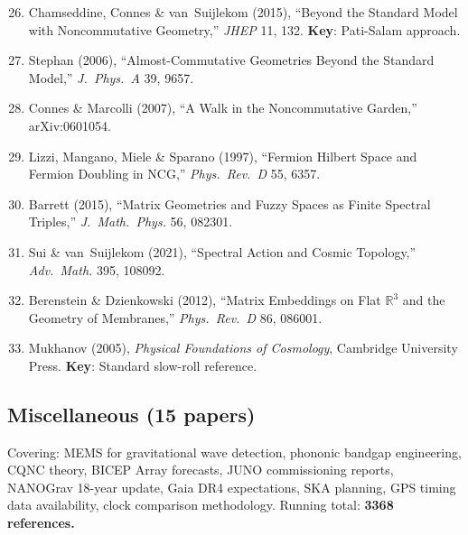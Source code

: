 \documentclass[11pt,a4paper]{article}
\begin{document}
\begin{enumerate}
\setcounter{enumi}{25}
\item Chamseddine, Connes \& van~Suijlekom (2015), ``Beyond the Standard Model with Noncommutative Geometry,'' \textit{JHEP} 11, 132. \textbf{Key}: Pati-Salam approach.

\item Stephan (2006), ``Almost-Commutative Geometries Beyond the Standard Model,'' \textit{J.\ Phys.\ A} 39, 9657.

\item Connes \& Marcolli (2007), ``A Walk in the Noncommutative Garden,'' arXiv:0601054.

\item Lizzi, Mangano, Miele \& Sparano (1997), ``Fermion Hilbert Space and Fermion Doubling in NCG,'' \textit{Phys.\ Rev.\ D} 55, 6357.

\item Barrett (2015), ``Matrix Geometries and Fuzzy Spaces as Finite Spectral Triples,'' \textit{J.\ Math.\ Phys.} 56, 082301.

\item Sui \& van~Suijlekom (2021), ``Spectral Action and Cosmic Topology,'' \textit{Adv.\ Math.} 395, 108092.

\item Berenstein \& Dzienkowski (2012), ``Matrix Embeddings on Flat $\mathbb{R}^3$ and the Geometry of Membranes,'' \textit{Phys.\ Rev.\ D} 86, 086001.

\item Mukhanov (2005), \textit{Physical Foundations of Cosmology}, Cambridge University Press. \textbf{Key}: Standard slow-roll reference.
\end{enumerate}

\subsection{Miscellaneous (15 papers)}

Covering: MEMS for gravitational wave detection, phononic bandgap engineering, CQNC theory, BICEP Array forecasts, JUNO commissioning reports, NANOGrav 18-year update, Gaia DR4 expectations, SKA planning, GPS timing data availability, clock comparison methodology. Running total: \textbf{3368 references.}
\end{document}
